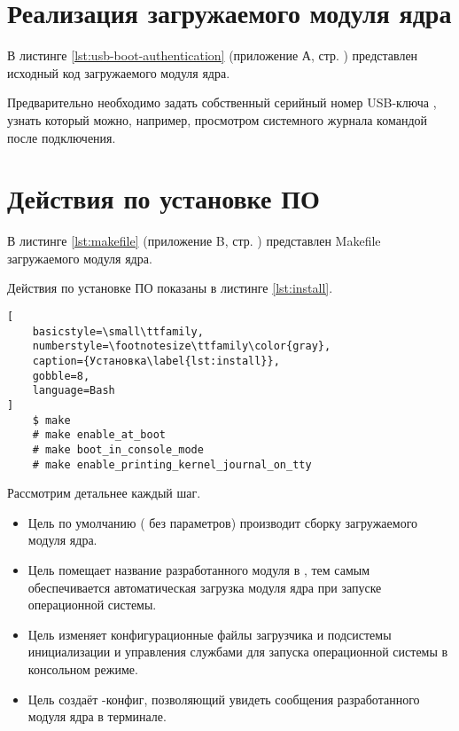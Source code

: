 \section{Реализация загружаемого модуля ядра}

В листинге \ref{lst:usb-boot-authentication} (приложение А, стр. \pageref{chp:attachment-a}) представлен исходный код загружаемого модуля ядра.

Предварительно необходимо задать собственный серийный номер USB-ключа , узнать который можно, например, просмотром системного журнала командой  после подключения.

\section{Действия по установке ПО}

В листинге \ref{lst:makefile} (приложение B, стр. \pageref{chp:attachment-b}) представлен Makefile загружаемого модуля ядра.

Действия по установке ПО показаны в листинге \ref{lst:install}.

\begin{lstlisting}[
	basicstyle=\small\ttfamily,
	numberstyle=\footnotesize\ttfamily\color{gray},
	caption={Установка\label{lst:install}},
	gobble=8,
	language=Bash
]
	$ make
	# make enable_at_boot
	# make boot_in_console_mode
	# make enable_printing_kernel_journal_on_tty
\end{lstlisting}

Рассмотрим детальнее каждый шаг.

\begin{itemize}
	\item Цель по умолчанию ( без параметров) производит сборку загружаемого модуля ядра.
	\item Цель  помещает название разработанного модуля в , тем самым обеспечивается автоматическая загрузка модуля ядра при запуске операционной системы.
	\item Цель  изменяет конфигурационные файлы загрузчика  и подсистемы инициализации и управления службами  для запуска операционной системы в консольном режиме.
	\item Цель  создаёт -конфиг, позволяющий увидеть сообщения разработанного модуля ядра в терминале.
\end{itemize}

